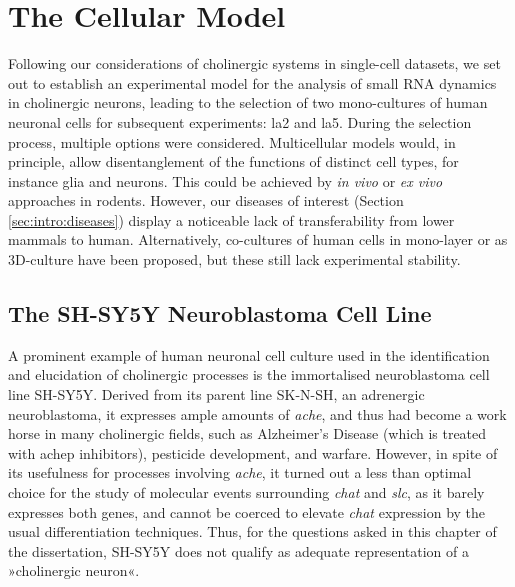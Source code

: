 \section{The Cellular Model} \label{sec:cellculture:model}
Following our considerations of cholinergic systems in single-cell datasets, we set out to establish an experimental model for the analysis of small RNA dynamics in cholinergic neurons, leading to the selection of two mono-cultures of human neuronal cells for subsequent experiments: \acs{la2} and \acs{la5}. During the selection process, multiple options were considered. Multicellular models would, in principle, allow disentanglement of the functions of distinct cell types, for instance glia and neurons. This could be achieved by \emph{in vivo} or \emph{ex vivo} approaches in rodents. However, our diseases of interest (Section \ref{sec:intro:diseases}) display a noticeable lack of transferability from lower mammals to human.\cite{Nestler2010, Drummond2017, Sommer2017} Alternatively, co-cultures of human cells in mono-layer or as 3D-culture have been proposed, but these still lack experimental stability.\cite{Watson2017}

\subsection{The SH-SY5Y Neuroblastoma Cell Line}
A prominent example of human neuronal cell culture used in the identification and elucidation of cholinergic processes is the immortalised neuroblastoma cell line SH-SY5Y.\cite{Biedler1978} Derived from its parent line SK-N-SH, an adrenergic neuroblastoma,\cite{Biedler1973} it expresses ample amounts of \textit{\ac{ache}}, and thus had become a work horse in many cholinergic fields, such as Alzheimer's Disease (which is treated with \ac{achep} inhibitors), pesticide development, and warfare. However, in spite of its usefulness for processes involving \textit{\ac{ache}}, it turned out a less than optimal choice for the study of molecular events surrounding \textit{\ac{chat}} and \textit{\ac{slc}}, as it barely expresses both genes, and cannot be coerced to elevate \textit{\ac{chat}} expression by the usual differentiation techniques.\cite{Korecka2013} Thus, for the questions asked in this chapter of the dissertation, SH-SY5Y does not qualify as adequate representation of a »cholinergic neuron«.

